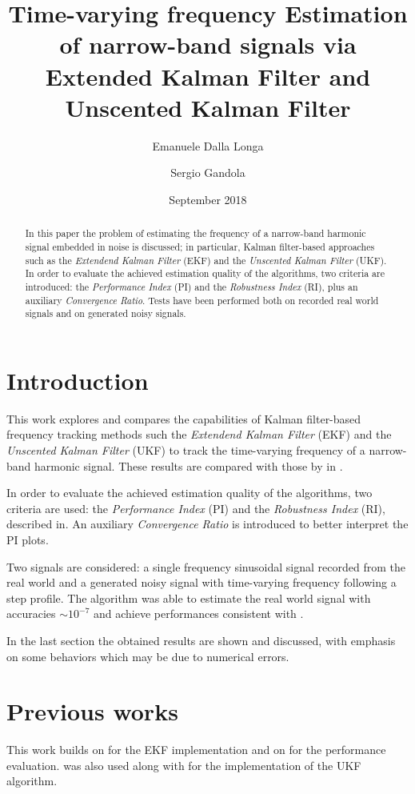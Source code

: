 \documentclass{article}
\title{Time-varying frequency Estimation of narrow-band signals via Extended Kalman Filter and Unscented Kalman Filter}
\author{Emanuele Dalla Longa \and Sergio Gandola}
\date{September 2018}
\begin{document}
\maketitle

\begin{abstract}
In this paper the problem of estimating the frequency of a narrow-band harmonic signal embedded in noise is discussed; in particular, Kalman filter-based approaches such as the \emph{Extendend Kalman Filter} (EKF) and the \emph{Unscented Kalman Filter} (UKF). In order to evaluate the achieved estimation quality of the algorithms, two criteria  are introduced: the \emph{Performance Index} (PI) and the \emph{Robustness Index} (RI), plus an auxiliary \emph{Convergence Ratio}. Tests have been performed both on recorded real world signals and on generated noisy signals.
\end{abstract}

\section{Introduction}
This work explores and compares the capabilities of Kalman filter-based frequency tracking methods such the \emph{Extendend Kalman Filter} (EKF) and the \emph{Unscented Kalman Filter} (UKF) to track the time-varying frequency of a narrow-band harmonic signal. These results are compared with those by \citeauthor{UKF} in \cite{UKF}. 

In order to evaluate the achieved estimation quality of the algorithms, two criteria are used: the \emph{Performance Index} (PI) and the \emph{Robustness Index} (RI), described in\cite{UKF}. An auxiliary \emph{Convergence Ratio} is introduced to better interpret the PI plots.

Two signals are considered: a single frequency sinusoidal signal recorded from the real world and a generated noisy signal with time-varying frequency following a step profile. The algorithm was able to estimate the real world signal with accuracies $\sim 10^{-7}$ and achieve performances consistent with \cite{UKF}.

In the last section the obtained results are shown and discussed, with emphasis on some behaviors which may be due to numerical errors.

\section{Previous works}
This work builds on \cite{EKF} for the EKF implementation and on \cite{UKF} for the performance evaluation. \cite{UKF} was also used along with \cite{ukftutorial} for the implementation of the UKF algorithm.
\end{document}
